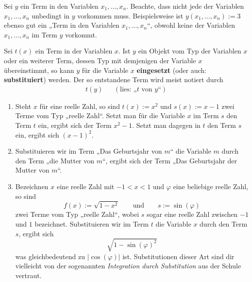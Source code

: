 \begin{bem}
    Sei $y$ ein Term in den Variablen $x_1,\dots , x_n$. Beachte, dass nicht jede der Variablen $x_1,\dots , x_n$ unbedingt in $y$ vorkommen muss. Beispielsweise ist $y(x_1,\dots , x_n):=3$ ebenso gut ein „Term in den Variablen $x_1,\dots , x_n$“, obwohl keine der Variablen $x_1,\dots , x_n$ im Term $y$ vorkommt.
\end{bem}


\begin{de}[* Variablensubstitution] \label{def:substitution}
    Sei $t(x)$ ein Term in der Variablen $x$. Ist $y$ ein Objekt vom Typ der Variablen $x$ oder ein weiterer Term, dessen Typ mit demjenigen der Variable $x$ übereinstimmt, so kann $y$ für die Variable $x$ \textbf{eingesetzt} (oder auch: \textbf{substituiert}) werden. Der so entstandene Term wird meist notiert durch
    \begin{align*}
        t(y) && (\text{lies: „$t$ von $y$“})
    \end{align*}
\end{de}


\begin{bsp}[*] \quad \label{bsp:substitution}
    \begin{enumerate}
        \item Steht $x$ für eine reelle Zahl, so sind $t(x):=x^2$ und $s(x):=x-1$ zwei Terme vom Typ „reelle Zahl“. Setzt man für die Variable $x$ im Term $s$ den Term $t$ ein, ergibt sich der Term $x^2-1$. Setzt man dagegen in $t$ den Term $s$ ein, ergibt sich $(x-1)^2$.
        \item Substituieren wir im Term „Das Geburtsjahr von $m$“ die Variable $m$ durch den Term „die Mutter von $m$“, ergibt sich der Term „Das Geburtsjahr der Mutter von $m$“.
        \item Bezeichnen $x$ eine reelle Zahl mit $-1<x<1$ und $\varphi$ eine beliebige reelle Zahl, so sind
            \[ f(x):=\sqrt{1-x^2} \qquad\text{und}\qquad s:=\sin(\varphi) \]
        zwei Terme vom Typ „reelle Zahl“, wobei $s$ sogar eine reelle Zahl zwischen $-1$ und $1$ bezeichnet. Substituieren wir im Term $t$ die Variable $x$ durch den Term $s$, ergibt sich
            \[ \sqrt{1-\sin(\varphi)^2} \]
        was gleichbedeutend zu $\vert \cos(\varphi)\vert$ ist. Substitutionen dieser Art sind dir vielleicht von der sogenannten \emph{Integration durch Substitution} aus der Schule vertraut.
    \end{enumerate}
\end{bsp}





